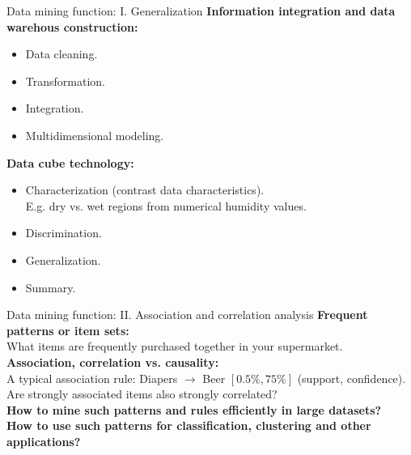 \documentclass[aspectratio=169,t]{beamer}
\begin{document}
  { 
    \begin{frame}{Data mining function: I. Generalization}
    \textbf{Information integration and data warehous construction:}
    \begin{itemize}
        \item Data cleaning.
        \item Transformation.
        \item Integration.
        \item Multidimensional modeling.
    \end{itemize}
    \textbf{Data cube technology:}
    \begin{itemize}
        \item Characterization (contrast data characteristics).\\
              E.g. dry vs. wet regions from numerical humidity values.
        \item Discrimination.
        \item Generalization.
        \item Summary.
    \end{itemize}
    \end{frame}
  }

  {
    \begin{frame}{Data mining function: II. Association and correlation analysis}
    \textbf{Frequent patterns or item sets:}\\
    What items are frequently purchased together in your supermarket.\\[0.5cm]

    \textbf{Association, correlation vs. causality:}\\
    A typical association rule: Diapers $\rightarrow$ Beer $[0.5\%,75\%]$ (support, confidence).\\
    Are strongly associated items also strongly correlated?\\[0.5cm]

    \textbf{How to mine such patterns and rules efficiently in large datasets?}\\
    \textbf{How to use such patterns for classification, clustering and other applications?}
    \end{frame}
  }
\end{document}
